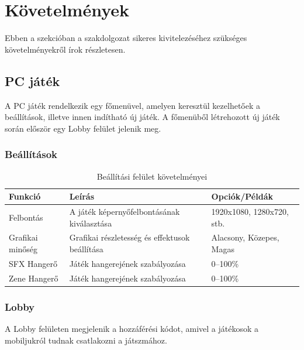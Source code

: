 \documentclass[]{thesis-ekf}
\theoremstyle{definition}
\theoremstyle{remark}
\begin{document}
\section{Követelmények}

Ebben a szekcióban a szakdolgozat sikeres kivitelezéséhez szükséges követelményekről írok részletesen.

\subsection{PC játék}

A PC játék rendelkezik egy főmenüvel, amelyen keresztül kezelhetőek a beállítások, illetve innen indítható új játék. A főmenüből létrehozott új játék során először egy Lobby felület jelenik meg.

\subsubsection{Beállítások}

\begin{table}[ht!]
	\centering
	\footnotesize
	\begin{tabular}{|p{4cm}|p{7cm}|p{4cm}|}
		\hline
		\textbf{Funkció} & \textbf{Leírás} & \textbf{Opciók/Példák} \\ 
		\hline
		Felbontás & A játék képernyőfelbontásának kiválasztása & 1920x1080, 1280x720, stb. \\ 
		\hline
		Grafikai minőség & Grafikai részletesség és effektusok beállítása & Alacsony, Közepes, Magas \\ 
		\hline
		SFX Hangerő & Játék hangerejének szabályozása & 0–100\% \\ 
		\hline
		Zene Hangerő & Játék hangerejének szabályozása & 0–100\% \\ 
		\hline
	\end{tabular}
	\caption{Beállítási felület követelményei}
\end{table}

\subsubsection{Lobby}

A Lobby felületen megjelenik a hozzáférési kódot, amivel a játékosok a mobiljukról tudnak csatlakozni a játszmához.
\end{document}
